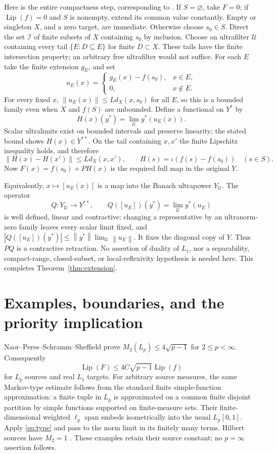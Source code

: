 \documentclass[11pt]{article}
\newcommand{\Lip}{\operatorname{Lip}}
\newcommand{\norm}[1]{\left\lVert#1\right\rVert}
\newcommand{\1}{\mathbf1}
\begin{document}
Here is the entire compactness step, corresponding to \cite[discussion (9)]{MN13}. If $S=\varnothing$, take $F=0$; if $\Lip(f)=0$ and $S$ is nonempty, extend its common value constantly. Empty or singleton $X$, and a zero target, are immediate. Otherwise choose $s_0\in S$. Direct the set $\mathcal I$ of finite subsets of $X$ containing $s_0$ by inclusion. Choose an ultrafilter $\mathcal U$ containing every tail $\{E:D\subseteq E\}$ for finite $D\subset X$. These tails have the finite intersection property; an arbitrary free ultrafilter would not suffice. For each $E$ take the finite extension $g_E$, and set
\[
 u_E(x)=\begin{cases}g_E(x)-f(s_0),&x\in E,\\0,&x\notin E.\end{cases}
\]
For every fixed $x$, $\norm{u_E(x)}\leq Ld_X(x,s_0)$ for all $E$, so this is a bounded family even when $X$ and $f(S)$ are unbounded. Define a functional on $Y^*$ by
\[
 H(x)(y^*)=\lim_{\mathcal U}y^*(u_E(x)).
\]
Scalar ultralimits exist on bounded intervals and preserve linearity; the stated bound shows $H(x)\in Y^{**}$. On the tail containing $x,x'$ the finite Lipschitz inequality holds, and therefore
\[
 \norm{H(x)-H(x')}\leq Ld_X(x,x'),\qquad
 H(s)=\iota(f(s)-f(s_0))\quad(s\in S).
\]
Now $F(x)=f(s_0)+PH(x)$ is the required full map in the original $Y$.

Equivalently, $x\mapsto[u_E(x)]$ is a map into the Banach ultrapower $Y_{\mathcal U}$. The operator
\[Q:Y_{\mathcal U}\to Y^{**},\qquad Q([u_E])(y^*)=\lim_{\mathcal U}y^*(u_E)\]
is well defined, linear and contractive: changing a representative by an ultranorm-zero family leaves every scalar limit fixed, and $|Q([u_E])(y^*)|\leq\norm{y^*}\lim_{\mathcal U}\norm{u_E}$. It fixes the diagonal copy of $Y$. Thus $PQ$ is a contractive retraction. No assertion of duality of $L_1$, nor a separability, compact-range, closed-subset, or local-reflexivity hypothesis is needed here. This completes Theorem~\ref{thm:extension}.

\section{Examples, boundaries, and the priority implication}\label{sec:priority}
Naor--Peres--Schramm--Sheffield \cite[Theorem 1.2]{NPSS} prove $M_2(L_p)\leq4\sqrt{p-1}$ for $2\leq p<\infty$. Consequently
\[\Lip(F)\leq4C\sqrt{p-1}\Lip(f)\]
for $L_p$ sources and real $L_1$ targets. For arbitrary source measures, the same Markov-type estimate follows from the standard finite simple-function approximation: a finite tuple in $L_p$ is approximated on a common finite disjoint partition by simple functions supported on finite-measure sets. Their finite-dimensional weighted $\ell_p$ span embeds isometrically into the usual $L_p[0,1]$. Apply \eqref{eq:type} and pass to the norm limit in its finitely many terms. Hilbert sources have $M_2=1$ \cite{Ball92}. These examples retain their source constant; no $p=\infty$ assertion follows.
\end{document}
